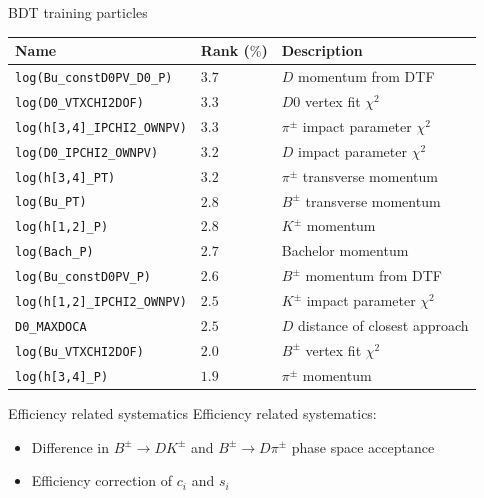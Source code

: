 \documentclass{beamer}
\begin{document}
\begin{frame}{BDT training particles}
  \centering
  \begin{tabular}{|l|l|l|}
    \hline
    Name & Rank ($\%$) & Description \\
    \hline
    \texttt{log(Bu\_constD0PV\_D0\_P)} & $3.7$ & $D$ momentum from DTF \\
    \texttt{log(D0\_VTXCHI2DOF)} & $3.3$ & $D0$ vertex fit $\chi^2$ \\
    \texttt{log(h[3,4]\_IPCHI2\_OWNPV)} & $3.3$ & $\pi^\pm$ impact parameter $\chi^2$ \\
    \texttt{log(D0\_IPCHI2\_OWNPV)} & $3.2$ & $D$ impact parameter $\chi^2$ \\
    \texttt{log(h[3,4]\_PT)} & $3.2$ & $\pi^\pm$ transverse momentum \\
    \texttt{log(Bu\_PT)} & $2.8$ & $B^\pm$ transverse momentum \\
    \texttt{log(h[1,2]\_P)} & $2.8$ & $K^\pm$ momentum \\
    \texttt{log(Bach\_P)} & $2.7$ & Bachelor momentum \\
    \texttt{log(Bu\_constD0PV\_P)} & $2.6$ & $B^\pm$ momentum from DTF \\
    \texttt{log(h[1,2]\_IPCHI2\_OWNPV)} & $2.5$ & $K^\pm$ impact parameter $\chi^2$ \\
    \texttt{D0\_MAXDOCA} & $2.5$ & $D$ distance of closest approach \\
    \texttt{log(Bu\_VTXCHI2DOF)} & $2.0$ & $B^\pm$ vertex fit $\chi^2$ \\
    \texttt{log(h[3,4]\_P)} & $1.9$ & $\pi^\pm$ momentum \\
    \hline
  \end{tabular}
\end{frame}

\begin{frame}{Efficiency related systematics}
  Efficiency related systematics:
  \vspace{0.7cm}
  \begin{itemize}
    \setlength\itemsep{2em}
    \item{Difference in $B^\pm\to DK^\pm$ and $B^\pm\to D\pi^\pm$ phase space acceptance}
    \item{Efficiency correction of $c_i$ and $s_i$}
  \end{itemize}
\end{frame}
\end{document}
